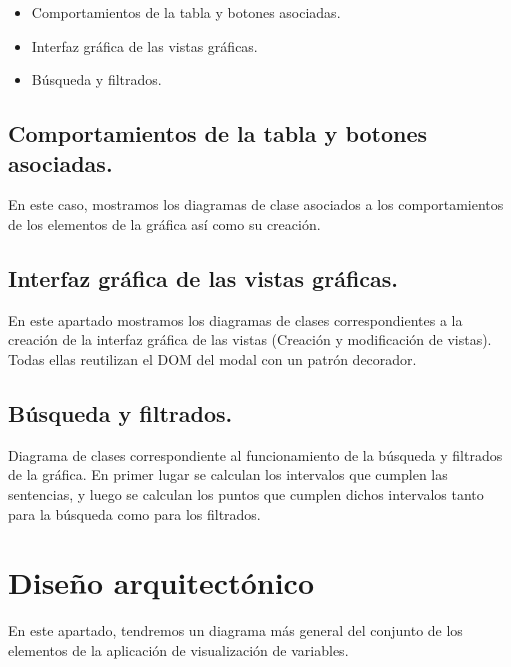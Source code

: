 \begin{itemize}
	\item Comportamientos de la tabla y botones asociadas.
	\item Interfaz gráfica de las vistas gráficas.
	\item Búsqueda y filtrados.
\end{itemize}

\subsection{Comportamientos de la tabla y botones asociadas.}
En este caso, mostramos los diagramas de clase asociados a los comportamientos de los elementos de la gráfica así como su creación.
\subsection{Interfaz gráfica de las vistas gráficas.}
En este apartado mostramos los diagramas de clases correspondientes a la creación de la interfaz gráfica de las vistas (Creación y modificación de vistas).
Todas ellas reutilizan el DOM del modal con un patrón decorador.

\subsection{Búsqueda y filtrados.}
Diagrama de clases correspondiente al funcionamiento de la búsqueda y filtrados de la gráfica.
En primer lugar se calculan los intervalos que cumplen las sentencias, y luego se calculan los puntos que cumplen dichos intervalos tanto para la búsqueda como para los filtrados.


\section{Diseño arquitectónico}

En este apartado, tendremos un diagrama más general del conjunto de los elementos de la aplicación de visualización de variables.
 




